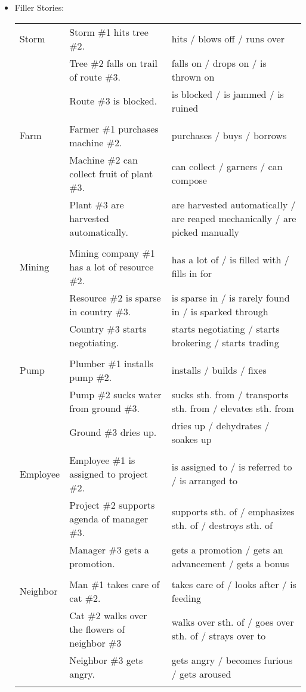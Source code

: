 \documentclass[a4paper,man,natbib,floatsintext,import]{apa6}
\begin{document}
\begin{itemize}
\begin{longtable}{p{}p{}p{}}
\end{longtable}
\item \normalsize Filler Stories:
\scriptsize
\begin{longtable}{p{}p{}p{}}
Storm & Storm \#1 hits tree \#2. & hits / blows off / runs over \\   & Tree \#2 falls on trail of route \#3. & falls on / drops on / is thrown on \\   & Route \#3 is blocked. & is blocked / is jammed / is ruined \\  & & \\ Farm & Farmer \#1 purchases machine \#2. & purchases / buys / borrows \\   & Machine \#2 can collect fruit of plant \#3. & can collect / garners / can compose \\   & Plant \#3 are harvested automatically. & are harvested automatically / are reaped mechanically / are picked manually \\  & & \\ Mining & Mining company \#1 has a lot of resource \#2. & has a lot of / is filled with / fills in for \\   & Resource \#2 is sparse in country \#3. & is sparse in / is rarely found in / is sparked through \\   & Country \#3 starts negotiating. & starts negotiating / starts brokering / starts trading \\  & & \\ Pump & Plumber \#1 installs pump \#2. & installs / builds / fixes \\   & Pump \#2 sucks water from ground \#3. & sucks sth. from / transports sth. from / elevates sth. from \\   & Ground \#3 dries up. & dries up / dehydrates / soakes up \\  & & \\ Employee & Employee \#1 is assigned to project \#2. & is assigned to / is referred to / is arranged to \\   & Project \#2 supports agenda of manager \#3. & supports sth. of / emphasizes sth. of / destroys sth. of \\   & Manager \#3 gets a promotion. & gets a promotion / gets an advancement / gets a bonus \\  & & \\ Neighbor & Man \#1 takes care of cat \#2. & takes care of / looks after / is feeding \\   & Cat \#2 walks over the flowers of neighbor \#3 & walks over sth. of / goes over sth. of / strays over to \\   & Neighbor \#3 gets angry. & gets angry / becomes furious / gets aroused \\  & & \\
\end{longtable}
\end{itemize}
\end{document}
